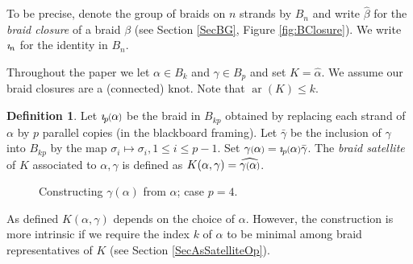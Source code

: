 \documentclass[11pt]{amsart}
\def\s{{\sigma}}
\def\ar{\operatorname{ar}}
\newcommand*{\smallp}[1]{\scalebox{.75}{\ensuremath#1}}
\newcommand{\pp}[2][p]{\imath_{\hspace*{-1pt}#1}\hspace*{-.5pt}\smallp(#2\smallp)}
\theoremstyle{definition}
\newtheorem{defn}[thm]{Definition}
\begin{document}
To be precise, denote the group of braids on $n$ strands by $B_n$ and write $\hat{\beta}$ for the \emph{braid closure} of a braid $\beta$ (see Section \ref{SecBG}, Figure \ref{fig:BClosure}). We write $\imath_{\hspace*{-1pt}n}$ for the identity in $B_n$. 

Throughout the paper we let $\alpha\in B_k$ and $\gamma\in B_p$ and set $K = \hat{\alpha}$. We assume our braid closures are a (connected) knot. Note that $\ar(K)\le k$.

\begin{defn} Let $\pp\alpha$ be the braid in $B_{kp}$ obtained by replacing each strand of $\alpha$ by $p$ parallel copies (in the blackboard framing). Let $\bar\gamma$ be the inclusion of $\gamma$ into $B_{kp}$ by the map $\s_i\mapsto\s_i, 1\le i\le p-1$. Set $\gamma\smallp(\alpha\smallp) = \pp\alpha\bar\gamma$. The \emph{braid satellite} of $K$ associated to $\alpha, \gamma$ is defined as $K(\alpha,\gamma) = \widehat{\gamma\smallp(\alpha\smallp)}$.
\label{defn:BraidSat}
\end{defn}

\begin{figure}[ht]
  \caption{Constructing $\gamma(\alpha)$ from $\alpha$; case $p=4$.}
  \label{FigBraidSat}
  \end{figure}

As defined $K(\alpha,\gamma)$ depends on the choice of $\alpha$. However, the construction is more intrinsic if we require the index $k$ of $\alpha$ to be minimal among braid representatives of $K$ (see Section \ref{SecAsSatelliteOp}). 
\end{document}
